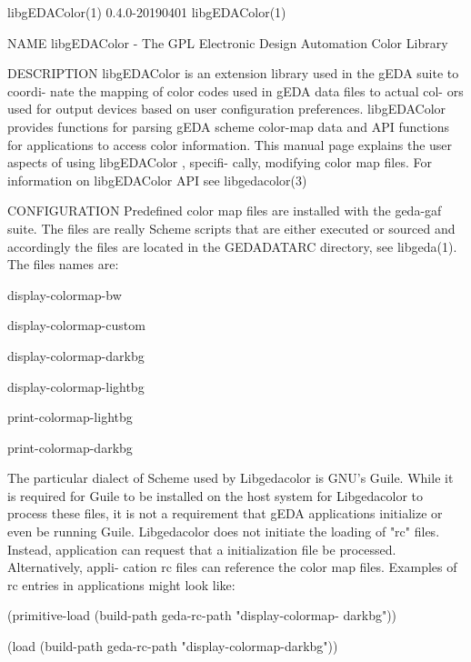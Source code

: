 libgEDAColor(1)                 0.4.0-20190401                 libgEDAColor(1)



NAME
       libgEDAColor - The GPL Electronic Design Automation Color Library

DESCRIPTION
       libgEDAColor  is an extension library used in the gEDA suite to coordi-
       nate the mapping of color codes used in gEDA data files to actual  col-
       ors  used  for  output devices based on user configuration preferences.
       libgEDAColor provides functions for parsing gEDA scheme color-map  data
       and  API  functions  for applications to access color information. This
       manual page explains the user aspects of using libgEDAColor ,  specifi-
       cally,  modifying  color map files. For information on libgEDAColor API
       see libgedacolor(3)

CONFIGURATION
       Predefined color map files are installed with the geda-gaf  suite.  The
       files are really Scheme scripts that are either executed or sourced and
       accordingly the files are located  in  the  GEDADATARC  directory,  see
       libgeda(1).  The files names are:

              display-colormap-bw

              display-colormap-custom

              display-colormap-darkbg

              display-colormap-lightbg

              print-colormap-lightbg

              print-colormap-darkbg

       The  particular  dialect of Scheme used by Libgedacolor is GNU's Guile.
       While it is required for Guile to be installed on the host  system  for
       Libgedacolor  to process these files, it is not a requirement that gEDA
       applications initialize or even be running  Guile.   Libgedacolor  does
       not  initiate  the  loading  of  "rc"  files.  Instead, application can
       request that a initialization file be processed. Alternatively,  appli-
       cation  rc  files  can  reference  the  color map files. Examples of rc
       entries in applications might look like:

              (primitive-load  (build-path   geda-rc-path   "display-colormap-
              darkbg"))

              (load (build-path geda-rc-path "display-colormap-darkbg"))


